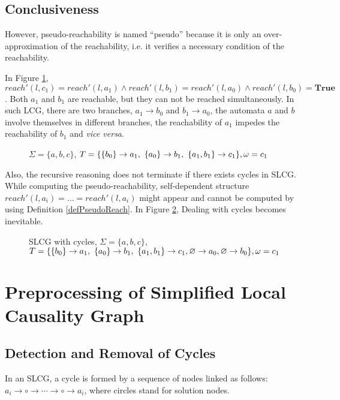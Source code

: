 \subsection{Conclusiveness}
However, pseudo-reachability is named ``pseudo'' because it is only an over-approximation of the reachability, i.e. it verifies a necessary condition of the reachability.
\begin{example}\label{example:unreach}
    In Figure \ref{fig:limitation}, $reach'(l,c_1)=reach'(l,a_1)\land reach'(l,b_1)=reach'(l,a_0)\land reach'(l,b_0)=\textbf{True}$. Both $a_1$ and $b_1$ are reachable, but they can not be reached simultaneously.
    In such LCG, there are two branches, $a_1\to b_0$ and $b_1\to a_0$, the automata $a$ and $b$ involve themselves in different branches, the reachability of $a_1$ impedes the reachability of $b_1$ and \textit{vice versa}.
\end{example}

\begin{figure}[ht]
    \centering
    
    \caption[Limitation of SLCG 1]{$\Sigma=\{a,b,c\}$, $T=\{\acm{b_0}{a_0}{a_1},\ \acm{a_0}{b_0}{b_1},\ \acm{a_1,b_1}{c_0}{c_1}\},\omega=c_1$}
    \label{fig:limitation}
\end{figure}

Also, the recursive reasoning does not terminate if there exists cycles in SLCG. 
While computing the pseudo-reachability, self-dependent structure  $reach'(l,a_i)=\ldots=reach'(l,a_i)$ might appear and cannot be computed by using Definition \ref{defPseudoReach}. 
In Figure \ref{fig:limitation2}, 
Dealing with cycles becomes inevitable.

\begin{figure}[ht]
    \centering
    
    \caption[Limitation of SLCG 2]{SLCG with cycles, $\Sigma=\{a,b,c\}$, $T=\{\acm{b_0}{a_0}{a_1},\ \acm{a_0}{b_0}{b_1},\ \acm{a_1,b_1}{c_0}{c_1},\varnothing \to a_0, \varnothing \to b_0\},\omega=c_1$}
    \label{fig:limitation2}
\end{figure}
\section{Preprocessing of Simplified Local Causality Graph}
\subsection{Detection and Removal of Cycles}
\begin{definition}[Cycle]
In an SLCG, a cycle is formed by a sequence of nodes linked as follows: $a_i\to \circ \to \cdots \to \circ \to a_i$, where circles stand for solution nodes.
\end{definition}

